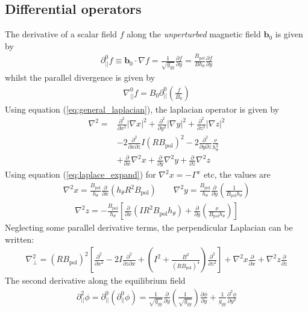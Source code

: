 \documentclass[12pt]{article}
\def\L{\left}
\def\R{\right}
\newcommand{\deriv}[2]{\ensuremath{\frac{\partial #1}{\partial #2}}}
\newcommand{\dderiv}[2]{\ensuremath{\frac{\partial^2 #1}{\partial {#2}^2}}}
\newcommand{\hthe}{\ensuremath{h_\theta}}
\newcommand{\Bp}{\ensuremath{B_{\text{pol}}}}
\newcommand{\ve}[1]{\ensuremath{\boldsymbol{#1}}}
\newcommand{\delp}{\nabla_\perp^2}
\newcommand{\rbp}{\ensuremath{R\Bp}}
\newcommand{\rbpsq}{\ensuremath{\L(\rbp\R)^2}}
\begin{document}
\subsection{Differential operators}
%
The derivative of a scalar field $f$ along the \emph{unperturbed} magnetic
field $\ve{b}_0$ is given by
%
\begin{align*}
\partial^0_{||}f \equiv \ve{b}_0 \cdot\nabla f =
\frac{1}{\sqrt{g_{yy}}}\deriv{f}{y} = \frac{\Bp}{B\hthe}\deriv{f}{y}
\end{align*}
%
whilst the parallel divergence is given by
%
\begin{align*}
\nabla^0_{||}f = B_0\partial^0_{||}\L(\frac{f}{B_0}\R)
\end{align*}
%
Using equation (\ref{eq:general_laplacian}), the laplacian operator is given by
%
\begin{align*}
\nabla^2 = &\frac{\partial^2}{\partial x^2}\L|\nabla x\R|^2 +
    \frac{\partial^2}{\partial y^2}\L|\nabla y\R|^2 +
    \frac{\partial^2}{\partial z^2}\L|\nabla z\R|^2 \nonumber \\
    &-2\frac{\partial^2}{\partial x\partial z}I\L(R\Bp\R)^2 -
    2\frac{\partial^2}{\partial y\partial z}\frac{\nu}{h_\theta^2}\\
    &+\frac{\partial}{\partial x}\nabla^2x + \frac{\partial}{\partial
y}\nabla^2y + \frac{\partial}{\partial z}\nabla^2z \nonumber
\end{align*}
%
Using equation (\ref{eq:laplace_expand}) for $\nabla^2x = -\Gamma^x$ etc, the
values are
%
\begin{align*}
\nabla^2x = \frac{\Bp}{h_\theta}\frac{\partial}{\partial x}\L(h_\theta
R^2\Bp\R) \qquad \nabla^2y = \frac{\Bp}{h_\theta}\frac{\partial}{\partial
y}\L(\frac{1}{\Bp h_\theta}\R)
\end{align*}
%
\begin{align*}
\nabla^2z = -\frac{\Bp}{h_\theta}\L[\frac{\partial}{\partial x}\L(IR^2\Bp
h_\theta\R) + \frac{\partial}{\partial y}\L(\frac{\nu}{\Bp
h_\theta}\R)\R]
\end{align*}
%
Neglecting some parallel derivative terms, the perpendicular Laplacian can be
written:
%
\begin{align*}
\delp = \rbpsq\L[\dderiv{}{x} - 2I\frac{\partial^2}{\partial z\partial x} +
\L(I^2 + \frac{B^2}{\L(\rbp\R)^4}\R)\dderiv{}{z}\R] +
\nabla^2 x \deriv{}{x} + \nabla^2 z\deriv{}{z}
\end{align*}
%
The second derivative along the equilibrium field
%
\begin{align*}
\partial^2_{||}\phi = \partial^0_{||}\L(\partial^0_{||}\phi\R) =
\frac{1}{\sqrt{g_{yy}}}\deriv{}{y}\L(\frac{1}{\sqrt{g_{yy}}}\R)\deriv{
\phi}{y} + \frac{1}{g_{yy}}\frac{\partial^2\phi}{\partial y^2}
\end{align*}
\end{document}

